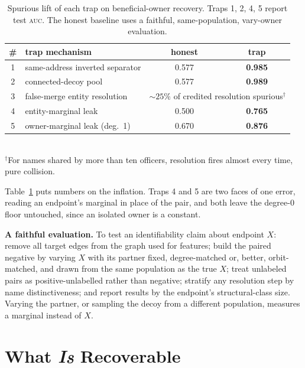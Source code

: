 \documentclass[sigconf]{acmart}
\begin{document}
\begin{table}[t]
\caption{Spurious lift of each trap on beneficial-owner recovery. Traps 1, 2, 4, 5
report test \textsc{auc}. The honest baseline uses a faithful, same-population,
vary-owner evaluation.}
\label{tab:traps}
\small
\begin{tabular}{@{}clcc@{}}
\toprule
\# & \textbf{trap mechanism} & \textbf{honest} & \textbf{trap}\\
\midrule
1 & same-address inverted separator & 0.577 & \textbf{0.985}\\
2 & connected-decoy pool            & 0.577 & \textbf{0.989}\\
3 & false-merge entity resolution   & \multicolumn{2}{c}{$\sim\!25\%$ of credited resolution spurious$^\dagger$}\\
4 & entity-marginal leak            & 0.500 & \textbf{0.765}\\
5 & owner-marginal leak (deg.\ 1)   & 0.670 & \textbf{0.876}\\
\bottomrule
\end{tabular}
\\[2pt]{\footnotesize $^\dagger$For names shared by more than ten officers,
resolution fires almost every time, pure collision.}
\end{table}

Table~\ref{tab:traps} puts numbers on the inflation. Traps 4 and 5 are two faces
of one error, reading an endpoint's marginal in place of the pair, and both leave
the degree-$0$ floor untouched, since an isolated owner is a constant.

\smallskip\noindent\textbf{A faithful evaluation.} To test an identifiability
claim about endpoint $X$: remove all target edges from the graph used for
features; build the paired negative by varying $X$ with its partner fixed,
degree-matched or, better, orbit-matched, and drawn from the same population as
the true $X$; treat unlabeled pairs as positive-unlabelled rather than negative;
stratify any resolution step by name distinctiveness; and report results by the
endpoint's structural-class size. Varying the partner, or sampling the decoy from
a different population, measures a marginal instead of $X$.

\section{What \emph{Is} Recoverable}\label{sec:external}
\end{document}

